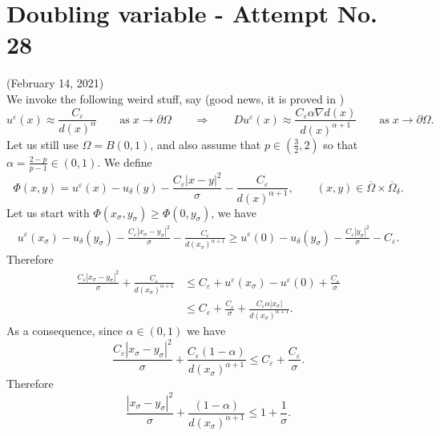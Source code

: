 \documentclass[11pt,reqno]{amsart}
\numberwithin{figure}{section}
\theoremstyle{plain}
\theoremstyle{remark}
\numberwithin{equation}{section}
\begin{document}
\section{Doubling variable - Attempt No. 28}
\noindent (February 14, 2021) \\
We invoke the following weird stuff, say (good news, it is proved in \cite{alessio_asymptotic_2006})
\begin{equation*}
 u^\varepsilon(x) \approx \frac{C_\varepsilon}{d(x)^\alpha} \qquad\text{as}\; x\to \partial\Omega\qquad \Longrightarrow\qquad Du^\varepsilon(x) \approx \frac{C_\varepsilon \alpha \nabla d(x)}{d(x)^{\alpha+1}} \qquad\text{as}\; x\to \partial\Omega.
\end{equation*}
Let us still use $\Omega = B(0,1)$, and also assume that $p\in \left(\frac{3}{2},2\right)$ so that $\alpha = \frac{2-p}{p-1} \in (0,1)$. We define
\begin{equation*}
    \Phi(x,y) = u^\varepsilon(x) - u_\delta(y) - \frac{C_\varepsilon |x-y|^2}{\sigma} - \frac{C_\varepsilon}{d(x)^{\alpha+1}}, \qquad (x,y)\in \overline{\Omega}\times \overline{\Omega}_\delta.
\end{equation*}
Let us start with $\Phi(x_\sigma,y_\sigma)\geq \Phi(0,y_\sigma)$, we have
\begin{align*}
    u^\varepsilon(x_\sigma) - u_\delta(y_\sigma) - \frac{C_\varepsilon |x_\sigma-y_\sigma|^2}{\sigma} - \frac{C_\varepsilon}{d(x_\sigma)^{\alpha+1}} \geq u^\varepsilon(0) - u_\delta(y_\sigma) - \frac{C_\varepsilon |y_\sigma|^2}{\sigma} - C_\varepsilon.
\end{align*}
Therefore
\begin{align*}
    \frac{C_\varepsilon |x_\sigma-y_\sigma|^2}{\sigma} + \frac{C_\varepsilon}{d(x_\sigma)^{\alpha+1}} &\leq C_\varepsilon + u^\varepsilon(x_\sigma) - u^\varepsilon(0) + \frac{C_\varepsilon }{\sigma}\\
    &\leq C_\varepsilon + \frac{C_\varepsilon}{\sigma} + \frac{C_\varepsilon \alpha|x_\sigma|}{d(x_\sigma)^{\alpha+1}}.
\end{align*}
As a consequence, since $\alpha \in (0,1)$ we have
\begin{equation*}
    \frac{C_\varepsilon |x_\sigma-y_\sigma|^2}{\sigma} + \frac{C_\varepsilon(1-\alpha)}{d(x_\sigma)^{\alpha+1}} 
    \leq C_\varepsilon + \frac{C_\varepsilon}{\sigma}.
\end{equation*}
Therefore
\begin{equation*}
    \frac{|x_\sigma - y_\sigma|^2}{\sigma} + \frac{(1-\alpha)}{d(x_\sigma)^{\alpha+1}} \leq 1 + \frac{1}{\sigma}.
\end{equation*}
\end{document}
